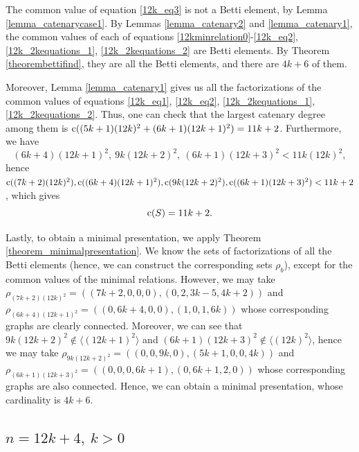 \documentclass[12pt]{article}
\theoremstyle{remark}
\begin{document}
The common value of equation \eqref{12k_eq3} is not a Betti element, by Lemma \ref{lemma_catenarycase1}. 
By Lemmas \ref{lemma_catenary2} and \ref{lemma_catenary1}, the common values of each of equations \eqref{12kminrelation0}-\eqref{12k_eq2}, \eqref{12k_2kequations_1}, \eqref{12k_2kequations_2} are Betti elements. By Theorem \ref{theorembettifind}, they are all the Betti elements, and there are $4k+6$ of them. 

Moreover, Lemma \ref{lemma_catenary1} gives us all the factorizations of the common values of equations \eqref{12k_eq1}, \eqref{12k_eq2}, \eqref{12k_2kequations_1}, \eqref{12k_2kequations_2}. Thus, one can check that the largest catenary degree among them is $\textup{c}( (5k+1)(12k)^2 + (6k+1)(12k+1)^2) = 11k+2$. Furthermore, we have
$$   (6k+4)(12k+1)^2, \ 9k(12k+2)^2, \ (6k+1)(12k+3)^2  < 11k(12k)^2, $$
hence $\textup{c}( (7k+2)(12k)^2), \textup{c}((6k+4)(12k+1)^2), \textup{c}(9k(12k+2)^2),\textup{c}((6k+1)(12k+3)^2) < 11k+2$, which gives
$$ \textup{c}(S) = 11k+2 .$$

Lastly, to obtain a minimal presentation, we apply Theorem \ref{theorem_minimalpresentation}. We know the sets of factorizations of all the Betti elements (hence, we can construct the corresponding sets $\rho_b$), except for the common values of the minimal relations. However, we may take $\rho_{(7k+2)(12k)^2} = ( (7k+2,0,0,0) ,(0,2,3k-5,4k+2))$ and $\rho_{(6k+4)(12k+1)^2} = ( (0,6k+4,0,0) ,(1,0,1,6k))$ whose corresponding graphs are clearly connected. Moreover, we can see that $9k(12k+2)^2 \notin \langle (12k+1)^2 \rangle$ and $(6k+1)(12k+3)^2 \notin \langle (12k)^2 \rangle $, hence we may take $\rho_{9k(12k+2)^2} = ( (0,0,9k,0) ,(5k+1,0,0,4k))$ and $\rho_{(6k+1)(12k+3)^2} = ( (0,0,0,6k+1) ,(0,6k+1,2,0))$ whose corresponding graphs are also connected. Hence, we can obtain a minimal presentation, whose cardinality is $4k+6$.  


\subsection{$n = 12k + 4, \  k >0$}
\end{document}
